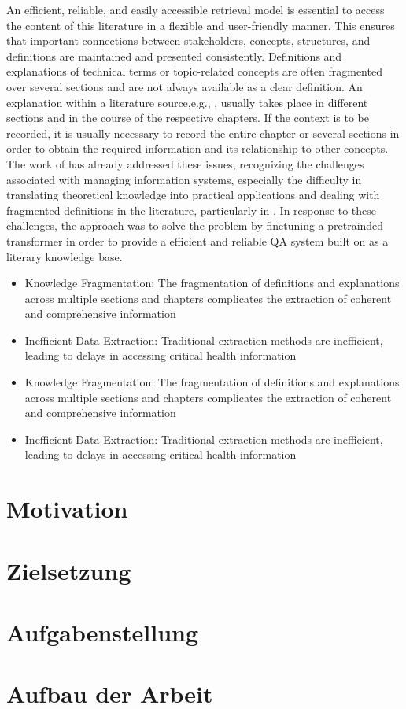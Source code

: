 An efficient, reliable, and easily accessible retrieval model is essential to access the content of this literature in a flexible and user-friendly manner. 
This ensures that important connections between stakeholders, concepts, structures, and definitions are maintained and presented consistently. 
Definitions and explanations of technical terms or topic-related concepts are often fragmented over several sections and are not always available as a clear definition. 
An explanation within a literature source,e.g., \citet{bb2}, usually takes place in different sections and in the course of the respective chapters.
If the context is to be recorded, it is usually necessary to record the entire chapter or several sections in order to obtain the required information and its relationship to other concepts. 
The work of \citet{Paul_Keller} has already addressed these issues, recognizing the challenges associated with managing information systems, especially the difficulty in translating theoretical knowledge into practical applications and dealing with fragmented definitions in the literature, particularly in \citet{bb2}. 
In response to these challenges, the approach was to solve the problem by finetuning a pretrainded transformer in order to provide a efficient and reliable QA system built on \citet{bb2} as a literary knowledge base.
%
\begin{itemize}
\item Knowledge Fragmentation: The fragmentation of definitions and explanations across multiple sections and chapters complicates the extraction of coherent and comprehensive information
\item Inefficient Data Extraction: Traditional extraction methods are inefficient, leading to delays in accessing critical health information
%
\end{itemize}
\begin{itemize}
\item Knowledge Fragmentation: The fragmentation of definitions and explanations across multiple sections and chapters complicates the extraction of coherent and comprehensive information
\item Inefficient Data Extraction: Traditional extraction methods are inefficient, leading to delays in accessing critical health information

\end{itemize}
\section{Motivation}


\section{Zielsetzung}\label{sec:zielsetzung}


\section{Aufgabenstellung}



\section{Aufbau der Arbeit}
